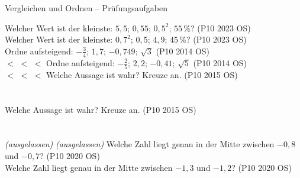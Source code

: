 \begin{aufgabe}{Vergleichen und Ordnen – Prüfungsaufgaben}
\begin{teile}
\teil Welcher Wert ist der kleinste: $5{,}5$; $0{,}55$; $0{,}5^2$; $55\,\%$? \hfill (P10 2023 OS) \\ \leerfeld
\teil Welcher Wert ist der kleinste: $0{,}7^2$; $0{,}5$; $4{,}9$; $45\,\%$? \hfill (P10 2023 OS) \\ \leerfeld
\teil Ordne aufsteigend: $-\frac{3}{4}$; $1{,}7$; $-0{,}749$; $\sqrt{3}$ \hfill (P10 2014 OS) \\ \leerfeld $<$ \leerfeld $<$ \leerfeld $<$ \leerfeld
\teil Ordne aufsteigend: $-\frac{2}{5}$; $2{,}2$; $-0{,}41$; $\sqrt{5}$ \hfill (P10 2014 OS) \\ \leerfeld $<$ \leerfeld $<$ \leerfeld $<$ \leerfeld
\teil Welche Aussage ist wahr? Kreuze an. \hfill (P10 2015 OS)\\ \\ \\ 
\teil Welche Aussage ist wahr? Kreuze an. \hfill (P10 2015 OS)\\ \\ \\ 
\teil \textit{(ausgelassen)}
\teil \textit{(ausgelassen)}
\teil Welche Zahl liegt genau in der Mitte zwischen $-0{,}8$ und $-0{,}7$? \hfill (P10 2020 OS) \\ \leerfeld
\teil Welche Zahl liegt genau in der Mitte zwischen $-1{,}3$ und $-1{,}2$? \hfill (P10 2020 OS) \\ \leerfeld
\end{teile}
\end{aufgabe}
